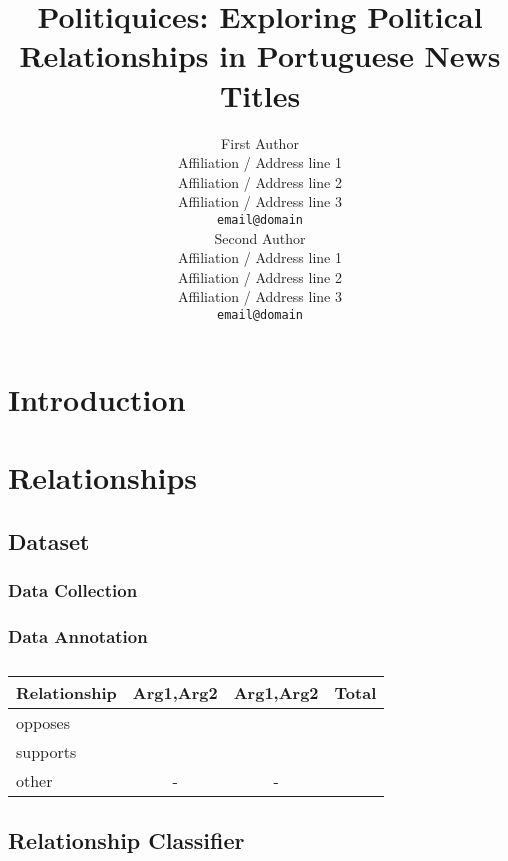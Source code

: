 \documentclass[11pt,a4paper]{article}
\title{Politiquices: Exploring Political Relationships in Portuguese News Titles}
\author{First Author \\
  Affiliation / Address line 1 \\
  Affiliation / Address line 2 \\
  Affiliation / Address line 3 \\
  \texttt{email@domain} \\\And
  Second Author \\
  Affiliation / Address line 1 \\
  Affiliation / Address line 2 \\
  Affiliation / Address line 3 \\
  \texttt{email@domain} \\}
\date{}
\begin{document}
\maketitle
\begin{abstract}

\end{abstract}


\section{Introduction}
\label{sec:intro}


\section{Relationships}
\label{sec:rel}






\subsection{Dataset}
\label{subsec:rel_data}

\subsubsection{Data Collection}
\label{subsubsec:rel_data_collec}


\subsubsection{Data Annotation}
\label{subsubsec:rel_data_annot}


\begin{table}[!h]
\centering
\begin{tabular}{lccr}
\hline \textbf{Relationship} & \textbf{Arg1,Arg2} & \textbf{Arg1,Arg2} & \textbf{Total} \\ \hline
opposes        &  &  \\
supports       &  &  \\
other          & - & - & \\
\hline
\end{tabular}
\caption{\label{font-table}  }
\end{table}

\subsection{Relationship Classifier}
\label{subsec:rel_classifier}
\end{document}
